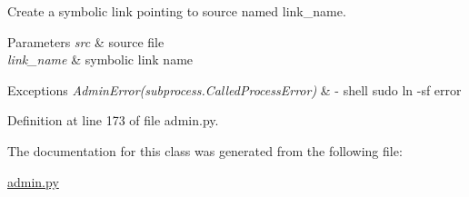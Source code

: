 Create a symbolic link pointing to source named {\ttfamily link\-\_\-name}. 


\begin{DoxyParams}{Parameters}
{\em src} & source file \\
\hline
{\em link\-\_\-name} & symbolic link name \\
\hline
\end{DoxyParams}

\begin{DoxyExceptions}{Exceptions}
{\em Admin\-Error(subprocess.\-Called\-Process\-Error)} & -\/ shell {\ttfamily sudo ln -\/sf} error \\
\hline
\end{DoxyExceptions}


Definition at line 173 of file admin.\-py.



The documentation for this class was generated from the following file\-:\begin{DoxyCompactItemize}
\item 
\hyperlink{admin_8py}{admin.\-py}\end{DoxyCompactItemize}
